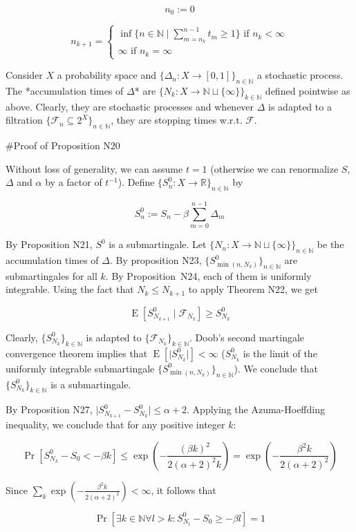 \documentclass[a4paper]{article}
\DeclareMathOperator{\Prb}{Pr}
\DeclareMathOperator{\E}{E}
\newcommand{\Nats}{\mathbb{N}}
\newcommand{\Reals}{\mathbb{R}}
\newcommand{\Sq}[2]{\{#1\}_{#2 \in \Nats}}
\newcommand{\Sqn}[1]{\Sq{#1}{n}}
\newcommand{\Abs}[1]{\lvert #1 \rvert}
\newcommand{\F}{\mathcal{F}}
\begin{document}
$$n_0 := 0$$

$$n_{k+1} = \begin{cases}\inf \{n \in \Nats \mid \sum_{m=n_k}^{n-1} t_m \geq 1\} \text{ if } n_k < \infty\\\infty \text{ if } n_k = \infty\end{cases}$$

Consider ${X}$ a probability space and ${\{\Delta_n:X \rightarrow [0,1]\}_{n \in \Nats}}$ a stochastic process. The *accumulation times of ${\Delta}$* are ${\{N_k: X \rightarrow \Nats \sqcup \{\infty\}\}_{k \in \Nats}}$ defined pointwise as above. Clearly, they are stochastic processes and whenever ${\Delta}$ is adapted to a filtration ${\Sqn{\F_n \subseteq 2^X}}$, they are stopping times w.r.t. ${\F}$.

\#Proof of Proposition N20

Without loss of generality, we can assume ${t = 1}$ (otherwise we can renormalize ${S}$, ${\Delta}$ and ${\alpha}$ by a factor of ${t^{-1}}$). Define ${\Sqn{S^0_n: X \rightarrow \Reals}}$ by

$$S^0_n := S_n - \beta \sum_{m=0}^{n-1} \Delta_m$$

By Proposition N21, ${S^0}$ is a submartingale. Let ${\Sqn{N_n:X \rightarrow \Nats \sqcup \{\infty\}}}$ be the accumulation times of ${\Delta}$. By proposition N23, ${\Sqn{S^0_{\min(n,N_k)}}}$ are submartingales for all ${k}$. By Proposition\ N24, each of them is uniformly integrable. Using the fact that ${N_{k} \leq N_{k+1}}$ to apply Theorem N22, we get

$$\E[S^0_{N_{k+1}} \mid \F_{N_k}] \geq S^0_{N_{k}}$$

Clearly, ${\Sq{S^0_{N_k}}{k}}$ is adapted to ${\Sq{\F_{N_k}}{k}}$. Doob's second martingale convergence theorem implies that ${\E[\Abs{S^0_{N_k}}] < \infty}$ (${S^0_{N_k}}$ is the limit of the uniformly integrable submartingale ${\Sqn{S^0_{\min(n,N_k)}}}$). We conclude that ${\Sq{S^0_{N_k}}{k}}$ is a submartingale.

By Proposition N27, ${\Abs{S^0_{N_{k+1}}-S^0_{N_k}}} \leq \alpha + 2$. Applying the Azuma-Hoeffding inequality, we conclude that for any positive integer ${k}$:

$$\Prb[S^0_{N_k} - S_0 < -\beta k] \leq \exp(-\frac{(\beta k)^2}{2(\alpha+2)^2 k})=\exp(-\frac{\beta^2 k}{2(\alpha+2)^2})$$

Since ${\sum_k \exp(-\frac{\beta^2 k}{2(\alpha+2)^2}) < \infty}$, it follows that

$$\Prb[\exists k \in \Nats \forall l > k: S^0_{N_l} - S_0 \geq -\beta l]=1$$
\end{document}
